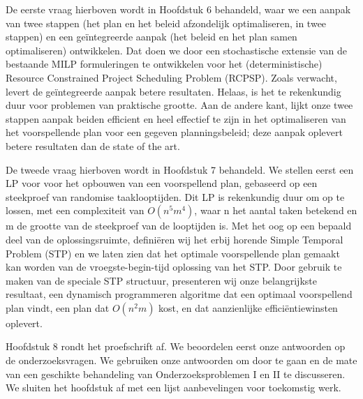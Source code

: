 De eerste vraag hierboven wordt in Hoofdstuk 6 behandeld, 
waar we een aanpak van twee stappen (het plan en het beleid afzondelijk optimaliseren, in twee stappen) 
en een geïntegreerde aanpak (het beleid en het plan samen optimaliseren) ontwikkelen. 
Dat doen we door een stochastische extensie van de bestaande MILP formuleringen te ontwikkelen voor het (deterministische) 
Resource Constrained Project Scheduling Problem (RCPSP). 
Zoals verwacht, levert de geïntegreerde aanpak betere resultaten. 
Helaas, is het te rekenkundig duur voor problemen van praktische grootte. 
Aan de andere kant, lijkt onze twee stappen aanpak beiden efficient en heel effectief te zijn in het optimaliseren van het voorspellende plan voor een gegeven planningsbeleid; 
deze aanpak oplevert betere resultaten dan de state of the art.

De tweede vraag hierboven wordt in Hoofdstuk 7 behandeld. 
We stellen eerst een LP voor voor het opbouwen van een voorspellend plan, 
gebaseerd op een steekproef van randomise taaklooptijden. 
Dit LP is rekenkundig duur om op te lossen, met een complexiteit van $O(n^5 m^4)$, 
waar n het aantal taken betekend en m de grootte van de steekproef van de looptijden is. 
Met het oog op een bepaald deel van de oplossingsruimte, 
definiëren wij het erbij horende Simple Temporal Problem (STP) 
en we laten zien dat het optimale voorspellende plan gemaakt kan worden van de vroegste-begin-tijd oplossing van het STP. 
Door gebruik te maken van de speciale STP structuur, 
presenteren wij onze belangrijkste resultaat, 
een dynamisch programmeren algoritme dat een optimaal voorspellend plan vindt, 
een plan dat $O(n^2 m)$ kost, en dat aanzienlijke efficiëntiewinsten oplevert.

Hoofdstuk 8 rondt het proefschrift af. 
We beoordelen eerst onze antwoorden op de onderzoeksvragen. 
We gebruiken onze antwoorden om door te gaan en de mate van een geschikte behandeling van Onderzoeksproblemen I en II te discusseren. 
We sluiten het hoofdstuk af met een lijst aanbevelingen voor toekomstig werk.
